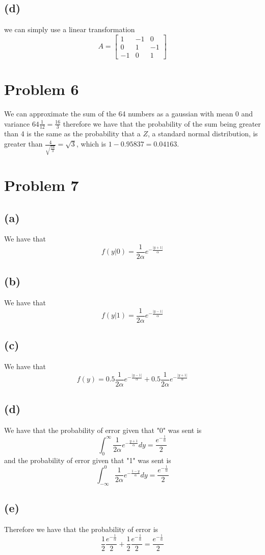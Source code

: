 \subsection*{(d)}
we can simply use a linear transformation $$A=\begin{bmatrix}1&-1&0\\0&1&-1\\-1 & 0 & 1\end{bmatrix}$$
\section*{Problem 6}
We can approximate the sum of the 64 numbers as a gaussian with 
mean 0 and variance $64\frac{1}{12}=\frac{16}{3}$ therefore we have that
the probability of the sum being greater than 4 is the same as the probability
that a $Z$, a standard normal distribution, is greater than $\frac{4}{\sqrt{\frac{16}{3}}}=\sqrt{3}$, 
which is $1-0.95837=\boxed{0.04163}$.
\section*{Problem 7}
\subsection*{(a)}
We have that 
$$f(y|0)=\frac{1}{2\alpha}e^{-\frac{|y+1|}{\alpha}}$$
\subsection*{(b)}
We have that
$$f(y|1)=\frac{1}{2\alpha}e^{-\frac{|y-1|}{\alpha}}$$
\subsection*{(c)}
We have that
$$f(y)=0.5\frac{1}{2\alpha}e^{-\frac{|y-1|}{\alpha}}+0.5\frac{1}{2\alpha}e^{-\frac{|y+1|}{\alpha}}$$
\subsection*{(d)}
We have that the probability of error given that 
"0" was sent is
$$\int_{0}^{\infty}\frac{1}{2\alpha}e^{-\frac{y+1}{\alpha}}dy=\frac{e^{-\frac{1}{\alpha}}}{2}$$
and the probability of error given that "1" was sent is
$$\int_{-\infty}^{0}\frac{1}{2\alpha}e^{-\frac{1-y}{\alpha}}dy=\frac{e^{-\frac{1}{\alpha}}}{2}$$
\subsection*{(e)}
Therefore we have that the probability of error is
$$\frac{1}{2}\frac{e^{-\frac{1}{\alpha}}}{2}+\frac{1}{2}\frac{e^{-\frac{1}{\alpha}}}{2}=\frac{e^{-\frac{1}{\alpha}}}{2}$$
